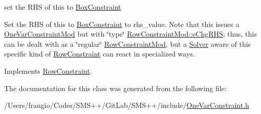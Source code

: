 set the R\+HS of this to \mbox{\hyperlink{class_s_m_spp__di__unipi__it_1_1_box_constraint}{Box\+Constraint}} 

Set the R\+HS of this to \mbox{\hyperlink{class_s_m_spp__di__unipi__it_1_1_box_constraint}{Box\+Constraint}} to rhs\+\_\+value. Note that this issues a \mbox{\hyperlink{class_s_m_spp__di__unipi__it_1_1_one_var_constraint_mod}{One\+Var\+Constraint\+Mod}} but with \char`\"{}type\char`\"{} \mbox{\hyperlink{class_s_m_spp__di__unipi__it_1_1_row_constraint_mod_af91e41a206e988d55a31347acd6f5d33a6c90a5d6f098c2913eef0d4058b65b1f}{Row\+Constraint\+Mod\+::e\+Chg\+R\+HS}}; thus, this can be dealt with as a \char`\"{}regular\char`\"{} \mbox{\hyperlink{class_s_m_spp__di__unipi__it_1_1_row_constraint_mod}{Row\+Constraint\+Mod}}, but a \mbox{\hyperlink{class_s_m_spp__di__unipi__it_1_1_solver}{Solver}} aware of this specific kind of \mbox{\hyperlink{class_s_m_spp__di__unipi__it_1_1_row_constraint}{Row\+Constraint}} can react in specialized ways. 

Implements \mbox{\hyperlink{class_s_m_spp__di__unipi__it_1_1_row_constraint_a42d5ec40966a094c7fa805a5ea44337b}{Row\+Constraint}}.



The documentation for this class was generated from the following file\+:\begin{DoxyCompactItemize}
\item 
/\+Users/frangio/\+Codes/\+S\+M\+S++/\+Git\+Lab/\+S\+M\+S++/include/\mbox{\hyperlink{_one_var_constraint_8h}{One\+Var\+Constraint.\+h}}\end{DoxyCompactItemize}
